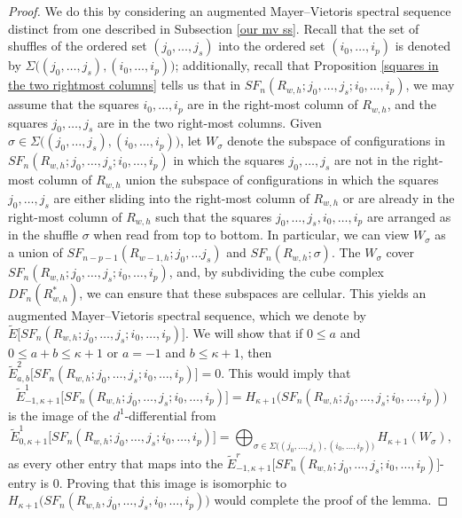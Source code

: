 \documentclass[pagebackref,colorlinks,citecolor=blue,linkcolor=blue,urlcolor=blue,filecolor=blue]{article}
\theoremstyle{definition}\newtheorem{definition}[thm]{Definition}
\theoremstyle{definition}
\begin{document}
\begin{proof}
We do this by considering an augmented Mayer--Vietoris spectral sequence distinct from one described in Subsection \ref{our mv ss}.
Recall that the set of shuffles of the ordered set $(j_{0},\dots, j_{s})$ into the ordered set $(i_{0},\dots, i_{p})$ is denoted by $\Sigma\big((j_{0},\dots, j_{s}), (i_{0},\dots, i_{p})\big)$; additionally, recall that Proposition \ref{squares in the two rightmost columns} tells us that in $SF_{n}(R_{w, h};j_{0}, \dots, j_{s};i_{0},\dots, i_{p})$, we may assume that the squares $i_{0}, \dots, i_{p}$ are in the right-most column of $R_{w, h}$, and the squares $j_{0}, \dots, j_{s}$ are in the two right-most columns.
Given $\sigma\in\Sigma\big((j_{0},\dots, j_{s}), (i_{0},\dots, i_{p})\big)$, let $W_{\sigma}$ denote the subspace of configurations in $SF_{n}(R_{w, h};j_{0}, \dots, j_{s};i_{0},\dots, i_{p})$ in which the squares $j_{0}, \dots, j_{s}$ are not in the right-most column of $R_{w, h}$ union the subspace of configurations in which the squares $j_{0}, \dots, j_{s}$ are either sliding into the right-most column of $R_{w, h}$ or are already in the right-most column of $R_{w, h}$ such that the squares $j_{0}, \dots, j_{s}, i_{0},\dots, i_{p}$ are arranged as in the shuffle $\sigma$ when read from top to bottom.
In particular, we can view $W_{\sigma}$ as a union of $SF_{n-p-1}(R_{w-1,h}; j_{0},\dots j_{s})$ and $SF_{n}(R_{w,h}; \sigma)$.
The $W_{\sigma}$ cover $SF_{n}(R_{w, h};j_{0}, \dots, j_{s};i_{0},\dots, i_{p})$, and, by subdividing the cube complex $DF_{n}(R^{*}_{w, h})$, we can ensure that these subspaces are cellular.
This yields an augmented Mayer--Vietoris spectral sequence, which we denote by $\tilde{E}\big[SF_{n}(R_{w, h};j_{0}, \dots, j_{s};i_{0},\dots, i_{p})\big]$. 
We will show that if $0\le a$ and $0\le a+b\le \kappa+1$ or $a=-1$ and $b\le \kappa+1$, then $\tilde{E}^{2}_{a,b}\big[SF_{n}(R_{w, h};j_{0}, \dots, j_{s};i_{0},\dots, i_{p})\big]=0$.
This would imply that 
\[
\tilde{E}^{1}_{-1,\kappa+1}\big[SF_{n}(R_{w, h};j_{0}, \dots, j_{s};i_{0},\dots, i_{p})\big]=H_{\kappa+1}\big(SF_{n}(R_{w, h};j_{0}, \dots, j_{s};i_{0},\dots, i_{p})\big)
\]
is the image of the $d^{1}$-differential from
\[
\tilde{E}^{1}_{0,\kappa+1}\big[SF_{n}(R_{w, h};j_{0}, \dots, j_{s};i_{0},\dots, i_{p})\big]=\bigoplus_{\sigma\in\Sigma\big((j_{0},\dots, j_{s}), (i_{0},\dots, i_{p})\big)} H_{\kappa+1}(W_{\sigma}),
\]
as every other entry that maps into the $\tilde{E}^{r}_{-1,\kappa+1}\big[SF_{n}(R_{w, h};j_{0}, \dots, j_{s};i_{0},\dots, i_{p})\big]$-entry is $0$.
Proving that this image is isomorphic to $H_{\kappa+1}\big(SF_{n}(R_{w, h},j_{0}, \dots, j_{s},i_{0},\dots, i_{p})\big)$ would complete the proof of the lemma.


\end{proof}
\end{document}
